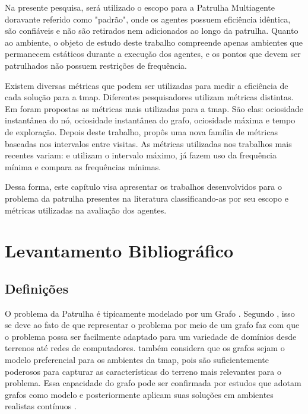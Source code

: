 Na presente pesquisa, será utilizado o escopo para a Patrulha Multiagente 
doravante referido como "padrão", onde os agentes possuem eficiência idêntica, 
são confiáveis e não são retirados nem adicionados ao longo da patrulha. Quanto 
ao ambiente, o objeto de estudo deste trabalho compreende apenas ambientes que 
permanecem estáticos durante a execução dos agentes, e os pontos que devem ser 
patrulhados não possuem restrições de frequência.

Existem diversas métricas que podem ser utilizadas para medir a eficiência de 
cada solução para a \ac{tmap}. Diferentes pesquisadores utilizam métricas 
distintas. Em \citep{Machado:2002:MPE:1765317.1765332} foram propostas as 
métricas mais utilizadas para a \ac{tmap}. São elas: ociosidade instantânea do 
nó, ociosidade instantânea do grafo, ociosidade máxima e tempo de exploração. 
Depois deste trabalho, \citep{sampaiophd} propôs uma nova família de métricas 
baseadas nos intervalos entre visitas. As métricas utilizadas nos trabalhos mais 
recentes variam: \citep{6900280} e \citep{Pippin:2013:PBT:2480362.2480378} 
utilizam o intervalo máximo, já \citep{4209122} fazem uso da frequência mínima e 
\citep{hernandez2013game} compara as frequências mínimas.

Dessa forma, este capítulo visa apresentar os trabalhos desenvolvidos para o 
problema da patrulha presentes na literatura classificando-as por seu escopo e 
métricas utilizadas na avaliação dos agentes.

\section{Levantamento Bibliográfico}

\subsection{Definições}
\label{definicoes_tmap}

O problema da Patrulha é tipicamente modelado por um Grafo 
\citep{Rosen:2002:DMA:579402}. Segundo \citep{Almeida:2004:AAI}, isso se deve 
ao fato de que representar o problema por meio de um grafo faz com que o 
problema possa ser facilmente adaptado para um variedade de domínios desde 
terrenos até redes de computadores. \citep{sampaiophd} também considera que os 
grafos sejam o modelo preferencial para os ambientes da \ac{tmap}, pois são 
suficientemente poderosos para capturar as características do terreno mais 
relevantes para o problema. Essa capacidade do grafo pode ser confirmada por 
estudos que adotam grafos como modelo e posteriormente aplicam suas soluções em 
ambientes realistas contínuos \citep{Pippin:2013:PBT:2480362.2480378}.

